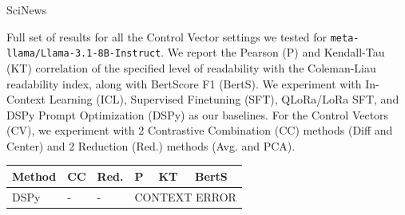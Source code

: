 \begin{table}[!ht]
\begin{subtable}[t]{0.45\textwidth}
\caption{SciNews}
\label{tab:main-results-llama-scinews}
\end{subtable}
\caption{Full set of results for all the Control Vector settings we tested for \texttt{meta-llama/Llama-3.1-8B-Instruct}. We report the Pearson (P) and Kendall-Tau (KT) correlation of the specified level of readability with the Coleman-Liau readability index, along with BertScore F1 (BertS). We experiment with In-Context Learning (ICL), Supervised Finetuning (SFT), QLoRa/LoRa SFT, and DSPy Prompt Optimization (DSPy) as our baselines. For the Control Vectors (CV), we experiment with 2 Contrastive Combination (CC) methods (Diff and Center) and 2 Reduction (Red.) methods (Avg. and PCA).}
\label{tab:main-results-llama}
\end{table}


\begin{table}[!ht]
\centering
\scriptsize
\setlength{\extrarowheight}{1pt} \setlength{\tabcolsep}{3pt} 
\hfill
\begin{subtable}[t]{0.48\textwidth}
\centering
\begin{tabular}{lll|lll}
\textbf{Method} & \textbf{CC} & \textbf{Red.} & \textbf{P} & \textbf{KT} & \textbf{BertS} \\ \hline
DSPy & - & - & \multicolumn{3}{c}{CONTEXT ERROR} \\

\end{tabular}
\end{subtable}
\end{table}

